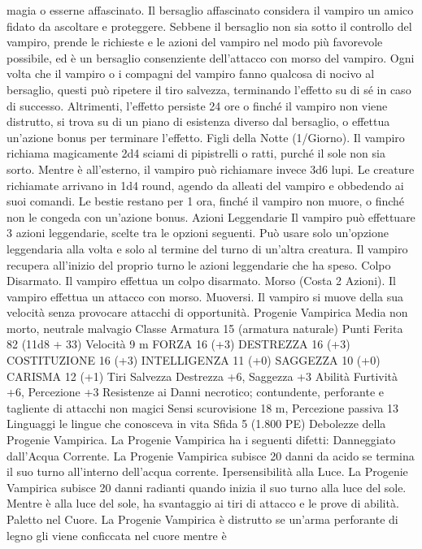 \begin{multicols}{2}
magia o esserne affascinato. Il bersaglio affascinato considera il
vampiro un amico fidato da ascoltare e proteggere. Sebbene il
bersaglio non sia sotto il controllo del vampiro, prende le
richieste e le azioni del vampiro nel modo più favorevole
possibile, ed è un bersaglio consenziente dell’attacco con morso
del vampiro.
Ogni volta che il vampiro o i compagni del vampiro fanno
qualcosa di nocivo al bersaglio, questi può ripetere il tiro
salvezza, terminando l’effetto su di sé in caso di successo.
Altrimenti, l’effetto persiste 24 ore o finché il vampiro non viene
distrutto, si trova su di un piano di esistenza diverso dal
bersaglio, o effettua un’azione bonus per terminare l’effetto.
Figli della Notte (1/Giorno). Il vampiro richiama magicamente
2d4 sciami di pipistrelli o ratti, purché il sole non sia sorto.
Mentre è all’esterno, il vampiro può richiamare invece 3d6 lupi.
Le creature richiamate arrivano in 1d4 round, agendo da alleati
del vampiro e obbedendo ai suoi comandi. Le bestie restano per
1 ora, finché il vampiro non muore, o finché non le congeda con
un’azione bonus.
Azioni Leggendarie
Il vampiro può effettuare 3 azioni leggendarie, scelte tra le
opzioni seguenti. Può usare solo un’opzione leggendaria alla
volta e solo al termine del turno di un’altra creatura. Il vampiro
recupera all’inizio del proprio turno le azioni leggendarie che ha
speso.
Colpo Disarmato. Il vampiro effettua un colpo disarmato.
Morso (Costa 2 Azioni). Il vampiro effettua un attacco con
morso.
Muoversi. Il vampiro si muove della sua velocità senza
provocare attacchi di opportunità.
Progenie Vampirica
Media non morto, neutrale malvagio
Classe Armatura 15 (armatura naturale)
Punti Ferita 82 (11d8 + 33)
Velocità 9 m
FORZA 16 (+3)
DESTREZZA 16 (+3)
COSTITUZIONE 16 (+3)
INTELLIGENZA 11 (+0)
SAGGEZZA 10 (+0)
CARISMA 12 (+1)
Tiri Salvezza Destrezza +6, Saggezza +3
Abilità Furtività +6, Percezione +3
Resistenze ai Danni necrotico; contundente, perforante e
tagliente di attacchi non magici
Sensi scurovisione 18 m, Percezione passiva 13
Linguaggi le lingue che conosceva in vita
Sfida 5 (1.800 PE)
Debolezze della Progenie Vampirica. La Progenie Vampirica ha
i seguenti difetti:
Danneggiato dall’Acqua Corrente. La Progenie Vampirica
subisce 20 danni da acido se termina il suo turno all’interno
dell’acqua corrente.
Ipersensibilità alla Luce. La Progenie Vampirica subisce 20
danni radianti quando inizia il suo turno alla luce del sole.
Mentre è alla luce del sole, ha svantaggio ai tiri di attacco e le
prove di abilità.
Paletto nel Cuore. La Progenie Vampirica è distrutto se un’arma
perforante di legno gli viene conficcata nel cuore mentre è

\end{multicols}
